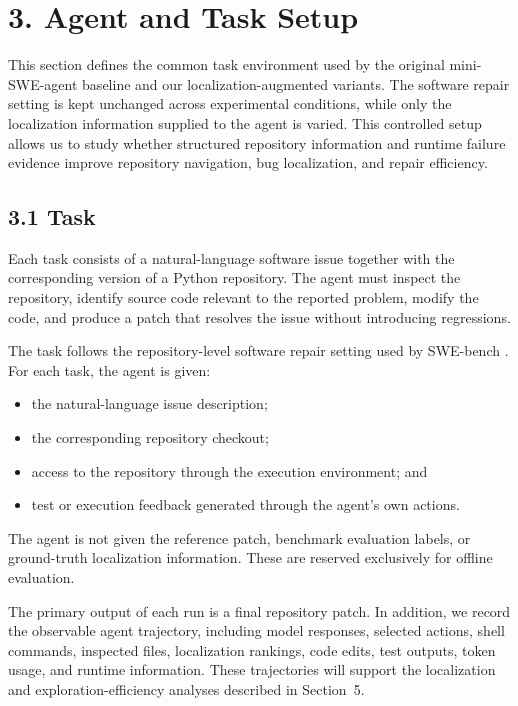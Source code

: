\documentclass[11pt]{article}
\begin{document}
\section*{3. Agent and Task Setup}

This section defines the common task environment used by the original
mini-SWE-agent baseline and our localization-augmented variants. The
software repair setting is kept unchanged across experimental conditions,
while only the localization information supplied to the agent is varied.
This controlled setup allows us to study whether structured repository
information and runtime failure evidence improve repository navigation,
bug localization, and repair efficiency.


\subsection*{3.1 Task}

Each task consists of a natural-language software issue together with the
corresponding version of a Python repository. The agent must inspect the
repository, identify source code relevant to the reported problem, modify
the code, and produce a patch that resolves the issue without introducing
regressions.

The task follows the repository-level software repair setting used by
SWE-bench \cite{jimenez2024swebench}. For each task, the agent is given:

\begin{itemize}[leftmargin=*, itemsep=0.25em]
    \item the natural-language issue description;
    \item the corresponding repository checkout;
    \item access to the repository through the execution environment; and
    \item test or execution feedback generated through the agent's own actions.
\end{itemize}

The agent is not given the reference patch, benchmark evaluation labels,
or ground-truth localization information. These are reserved exclusively
for offline evaluation.

The primary output of each run is a final repository patch. In addition,
we record the observable agent trajectory, including model responses,
selected actions, shell commands, inspected files, localization rankings,
code edits, test outputs, token usage, and runtime information. These
trajectories will support the localization and exploration-efficiency
analyses described in Section~5.
\end{document}

